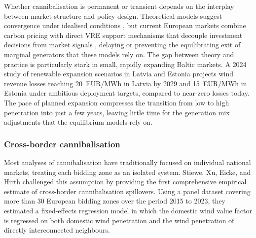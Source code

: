 Whether cannibalisation is permanent or transient depends on the interplay between market structure and policy design. Theoretical models suggest convergence under idealised conditions \cite{Antweiler2021, Brown2021}, but current European markets combine carbon pricing with direct VRE support mechanisms that decouple investment decisions from market signals \cite{Hirth2013}, delaying or preventing the equilibrating exit of marginal generators that these models rely on. The gap between theory and practice is particularly stark in small, rapidly expanding Baltic markets. A 2024 study of renewable expansion scenarios in Latvia and Estonia \cite{BalticCannibalisation2024_studies} projects wind revenue losses reaching 20~EUR/MWh in Latvia by 2029 and 15~EUR/MWh in Estonia under ambitious deployment targets, compared to near-zero losses today. The pace of planned expansion compresses the transition from low to high penetration into just a few years, leaving little time for the generation mix adjustments that the equilibrium models rely on.

\subsubsection{Cross-border cannibalisation}

Most analyses of cannibalisation have traditionally focused on individual national markets, treating each bidding zone as an isolated system. Stiewe, Xu, Eicke, and Hirth \cite{Stiewe2025} challenged this assumption by providing the first comprehensive empirical estimate of cross-border cannibalisation spillovers. Using a panel dataset covering more than 30 European bidding zones over the period 2015 to 2023, they estimated a fixed-effects regression model in which the domestic wind value factor is regressed on both domestic wind penetration and the wind penetration of directly interconnected neighbours.

\vspace{4pt}

